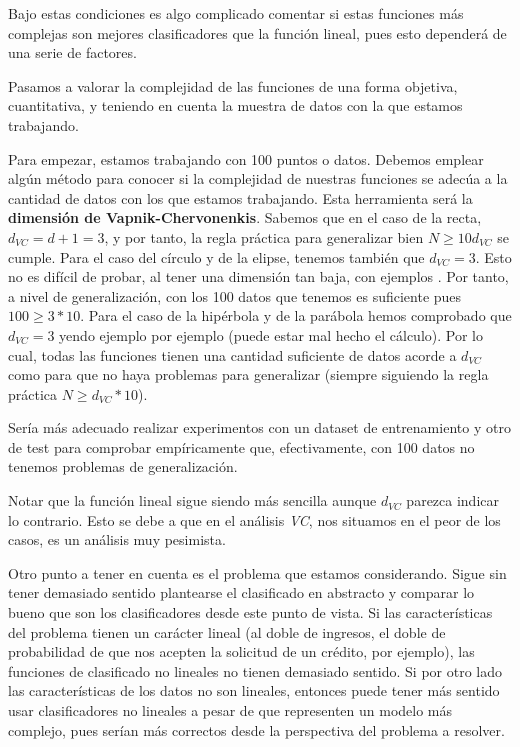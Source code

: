 \documentclass[11pt]{article}
\begin{document}
Bajo estas condiciones es algo complicado comentar si estas funciones más complejas son mejores clasificadores que la función lineal, pues esto dependerá de una serie de factores.

Pasamos a valorar la complejidad de las funciones de una forma objetiva, cuantitativa, y teniendo en cuenta la muestra de datos con la que estamos trabajando.

Para empezar, estamos trabajando con 100 puntos o datos. Debemos emplear algún método para conocer si la complejidad de nuestras funciones se adecúa a la cantidad de datos con los que estamos trabajando. Esta herramienta será la \textbf{dimensión de Vapnik-Chervonenkis}. Sabemos que en el caso de la recta, $d_{VC} = d + 1 = 3$, y por tanto, la regla práctica para generalizar bien $N \geq 10 d_{VC}$ se cumple. Para el caso del círculo y de la elipse, tenemos también que $d_{VC} = 3$. Esto no es difícil de probar, al tener una dimensión tan baja, con ejemplos \footnotemark. Por tanto, a nivel de generalización, con los 100 datos que tenemos es suficiente pues $100 \geq 3 * 10$. Para el caso de la hipérbola y de la parábola hemos comprobado que $d_{VC} = 3$ yendo ejemplo por ejemplo (puede estar mal hecho el cálculo). Por lo cual, todas las funciones tienen una cantidad suficiente de datos acorde a $d_{VC}$ como para que no haya problemas para generalizar (siempre siguiendo la regla práctica $N \geq d_{VC} * 10$).

Sería más adecuado realizar experimentos con un dataset de entrenamiento y otro de test para comprobar empíricamente que, efectivamente, con 100 datos no tenemos problemas de generalización.

Notar que la función lineal sigue siendo más sencilla aunque $d_{VC}$ parezca indicar lo contrario. Esto se debe a que en el análisis \emph{VC}, nos situamos en el peor de los casos, es un análisis muy pesimista.

Otro punto a tener en cuenta es el problema que estamos considerando. Sigue sin tener demasiado sentido plantearse el clasificado en abstracto y comparar lo bueno que son los clasificadores desde este punto de vista. Si las características del problema tienen un carácter lineal (al doble de ingresos, el doble de probabilidad de que nos acepten la solicitud de un crédito, por ejemplo), las funciones de clasificado no lineales no tienen demasiado sentido. Si por otro lado las características de los datos no son lineales, entonces puede tener más sentido usar clasificadores no lineales a pesar de que representen un modelo más complejo, pues serían más correctos desde la perspectiva del problema a resolver.
\end{document}
